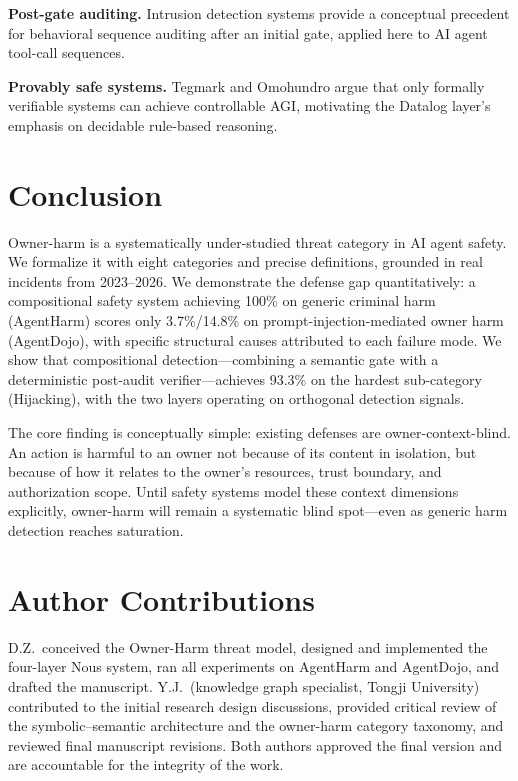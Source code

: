 \documentclass{article}
\theoremstyle{definition}
\begin{document}
\textbf{Post-gate auditing.} Intrusion detection systems \cite{liao2013intrusion}
provide a conceptual precedent for behavioral sequence auditing after an
initial gate, applied here to AI agent tool-call sequences.

\textbf{Provably safe systems.} Tegmark and Omohundro
\cite{tegmark2023provably} argue that only formally verifiable systems can
achieve controllable AGI, motivating the Datalog layer's emphasis on
decidable rule-based reasoning.

\section{Conclusion}
\label{sec:conclusion}

Owner-harm is a systematically under-studied threat category in AI agent
safety. We formalize it with eight categories and precise definitions,
grounded in real incidents from 2023--2026. We demonstrate the
defense gap quantitatively: a compositional safety system achieving 100\%
on generic criminal harm (AgentHarm) scores only 3.7\%/14.8\% on
prompt-injection-mediated owner harm (AgentDojo), with specific structural
causes attributed to each failure mode. We show that compositional
detection---combining a semantic gate with a deterministic post-audit
verifier---achieves 93.3\% on the hardest sub-category (Hijacking), with
the two layers operating on orthogonal detection signals.

The core finding is conceptually simple: existing defenses are
owner-context-blind. An action is harmful to an owner not because of its
content in isolation, but because of how it relates to the owner's
resources, trust boundary, and authorization scope. Until safety systems
model these context dimensions explicitly, owner-harm will remain a
systematic blind spot---even as generic harm detection reaches saturation.

\section*{Author Contributions}

D.Z.\ conceived the Owner-Harm threat model, designed and implemented
the four-layer Nous system, ran all experiments on AgentHarm and
AgentDojo, and drafted the manuscript. Y.J.\ (knowledge graph
specialist, Tongji University) contributed to the initial research
design discussions, provided critical review of the
symbolic--semantic architecture and the owner-harm category taxonomy,
and reviewed final manuscript revisions. Both authors approved the
final version and are accountable for the integrity of the work.



\end{document}
